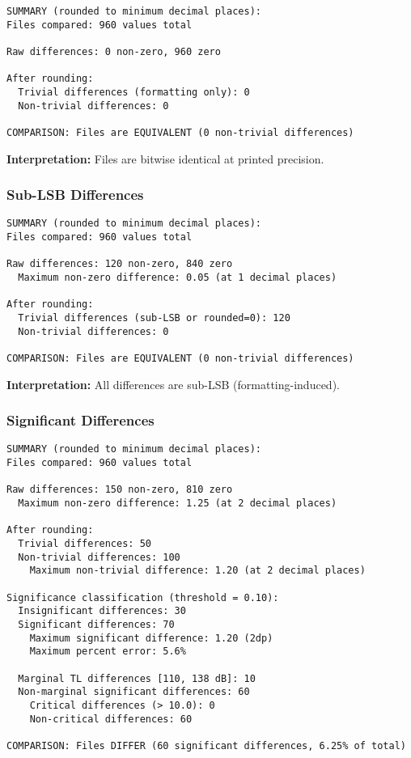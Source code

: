 \begin{verbatim}
SUMMARY (rounded to minimum decimal places):
Files compared: 960 values total

Raw differences: 0 non-zero, 960 zero

After rounding:
  Trivial differences (formatting only): 0
  Non-trivial differences: 0

COMPARISON: Files are EQUIVALENT (0 non-trivial differences)
\end{verbatim}

\textbf{Interpretation:} Files are bitwise identical at printed precision.

\subsubsection{Sub-LSB Differences}

\begin{verbatim}
SUMMARY (rounded to minimum decimal places):
Files compared: 960 values total

Raw differences: 120 non-zero, 840 zero
  Maximum non-zero difference: 0.05 (at 1 decimal places)

After rounding:
  Trivial differences (sub-LSB or rounded=0): 120
  Non-trivial differences: 0

COMPARISON: Files are EQUIVALENT (0 non-trivial differences)
\end{verbatim}

\textbf{Interpretation:} All differences are sub-LSB (formatting-induced).

\subsubsection{Significant Differences}

\begin{verbatim}
SUMMARY (rounded to minimum decimal places):
Files compared: 960 values total

Raw differences: 150 non-zero, 810 zero
  Maximum non-zero difference: 1.25 (at 2 decimal places)

After rounding:
  Trivial differences: 50
  Non-trivial differences: 100
    Maximum non-trivial difference: 1.20 (at 2 decimal places)

Significance classification (threshold = 0.10):
  Insignificant differences: 30
  Significant differences: 70
    Maximum significant difference: 1.20 (2dp)
    Maximum percent error: 5.6%
  
  Marginal TL differences [110, 138 dB]: 10
  Non-marginal significant differences: 60
    Critical differences (> 10.0): 0
    Non-critical differences: 60

COMPARISON: Files DIFFER (60 significant differences, 6.25% of total)
\end{verbatim}

